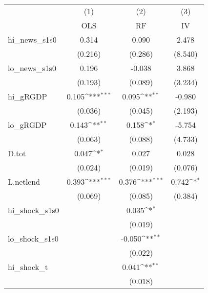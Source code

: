 {
\def\sym#1{\ifmmode^{#1}\else\(^{#1}\)\fi}
\begin{tabular}{l*{3}{c}}
\toprule
            &\multicolumn{1}{c}{(1)}&\multicolumn{1}{c}{(2)}&\multicolumn{1}{c}{(3)}\\
            &\multicolumn{1}{c}{OLS}&\multicolumn{1}{c}{RF}&\multicolumn{1}{c}{IV}\\
\midrule
hi\_news\_s1s0&       0.314         &       0.090         &       2.478         \\
            &     (0.216)         &     (0.286)         &     (8.540)         \\
\addlinespace
lo\_news\_s1s0&       0.196         &      -0.038         &       3.868         \\
            &     (0.193)         &     (0.089)         &     (3.234)         \\
\addlinespace
hi\_gRGDP    &       0.105\sym{***}&       0.095\sym{**} &      -0.980         \\
            &     (0.036)         &     (0.045)         &     (2.193)         \\
\addlinespace
lo\_gRGDP    &       0.143\sym{**} &       0.158\sym{*}  &      -5.754         \\
            &     (0.063)         &     (0.088)         &     (4.733)         \\
\addlinespace
D.tot       &       0.047\sym{*}  &       0.027         &       0.028         \\
            &     (0.024)         &     (0.019)         &     (0.076)         \\
\addlinespace
L.netlend   &       0.393\sym{***}&       0.376\sym{***}&       0.742\sym{*}  \\
            &     (0.069)         &     (0.085)         &     (0.384)         \\
\addlinespace
hi\_shock\_s1s0&                     &       0.035\sym{*}  &                     \\
            &                     &     (0.019)         &                     \\
\addlinespace
lo\_shock\_s1s0&                     &      -0.050\sym{**} &                     \\
            &                     &     (0.022)         &                     \\
\addlinespace
hi\_shock\_t  &                     &       0.041\sym{**} &                     \\
            &                     &     (0.018)         &                     \\

\end{tabular}}
